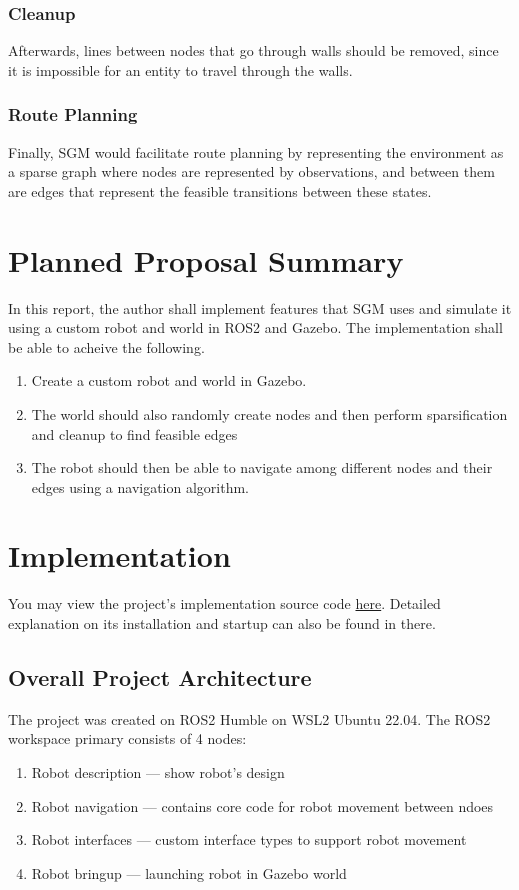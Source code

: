 \documentclass[conference]{IEEEtran}
\begin{document}
\subsubsection{Cleanup}
Afterwards, lines between nodes that go through walls should be removed, since it is impossible for an entity to travel through the walls.

\subsubsection{Route Planning}
Finally, SGM would facilitate route planning by representing the environment as a sparse graph where nodes are represented by observations, and between them are edges that represent the feasible transitions between these states.


\section{Planned Proposal Summary}

In this report, the author shall implement features that SGM uses and simulate it using a custom robot and world in ROS2 and Gazebo.
The implementation shall be able to acheive the following.
\begin{enumerate}
  \item Create a custom robot and world in Gazebo.
  \item The world should also randomly create nodes and then perform sparsification and cleanup to find feasible edges
  \item The robot should then be able to navigate among different nodes and their edges using a navigation algorithm.
\end{enumerate}

\section{Implementation}
You may view the project's implementation source code \href{https://github.com/demeritbird/Sparse-Graphical-Memory-Robot-Planning}{here}. Detailed explanation on its installation and startup can also be found in there.

\subsection{Overall Project Architecture}
The project was created on ROS2 Humble on WSL2 Ubuntu 22.04.
The ROS2 workspace primary consists of 4 nodes:
\begin{enumerate}
  \item Robot description --- show robot's design
  \item Robot navigation --- contains core code for robot movement between ndoes
  \item Robot interfaces --- custom interface types to support robot movement
  \item Robot bringup --- launching robot in Gazebo world
\end{enumerate}
\end{document}
